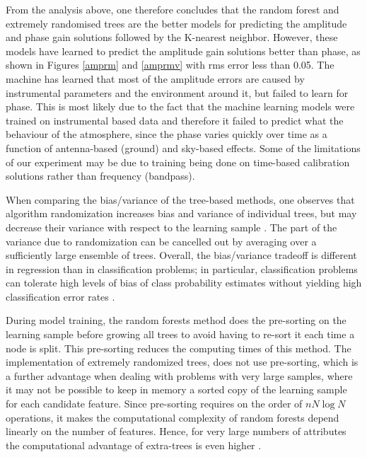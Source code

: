 From the analysis above, one therefore concludes that the random forest and extremely randomised trees are the better models for predicting the amplitude and phase gain solutions followed by the K-nearest neighbor. However, these models have learned to predict the amplitude gain solutions better than phase, as shown in Figures \ref{amprm} and \ref{amprmv} with rms  error less than 0.05. The machine has learned that most of the amplitude errors are caused by instrumental parameters and the environment around it, but failed to learn for phase. This is most likely due to the fact that the machine learning models were trained on instrumental based data and  therefore it failed to predict what the behaviour of the atmosphere, since the phase varies quickly over time as a function of antenna-based (ground) and sky-based effects. Some of the limitations of our experiment may be due to training being done on time-based calibration solutions rather than frequency (bandpass). 

When comparing the bias/variance of the tree-based methods, one observes that algorithm randomization increases bias and variance of individual trees, but  may decrease their variance with respect to the learning sample \citep{geurts2006extremely}. The part of the variance due to randomization can be cancelled out by averaging over a
sufficiently large ensemble of trees. Overall, the bias/variance tradeoff is different in regression than in classification problems;
in particular, classification problems can tolerate high levels of bias of class probability estimates without yielding high classification error rates \citep{geurts2006extremely}. 

During model training, the random forests method does the pre-sorting on the learning sample before growing all trees to avoid having to re-sort it each time a node is split. This pre-sorting reduces the computing times of this method. The implementation of extremely randomized trees, does not use pre-sorting, which is a further advantage when dealing with problems with very large samples, where it may not be possible to keep in memory a sorted copy of the learning sample for each candidate feature. Since pre-sorting requires on the order of $nN\log N$ operations, it makes the
computational complexity of random forests depend linearly on the number of features. Hence, for very large numbers of attributes the computational advantage of extra-trees is even higher \citep{geurts2006extremely}.



